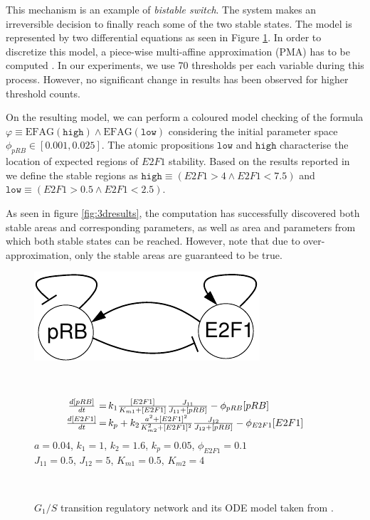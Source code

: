 \documentclass[12pt,oneside]{fithesis2}
\newcommand{\ef}[1]{\ensuremath{\mbox{EF} #1}}
\newcommand{\ag}[1]{\ensuremath{\mbox{AG} #1}}
\begin{document}
				This mechanism is an example of \emph{bistable switch}. The system makes an irreversible decision to finally reach some of the two stable states. The model is represented by two differential equations as seen in Figure \ref{fig:genmodel}. In order to discretize this model, a piece-wise multi-affine approximation (PMA) has to be computed \cite{grosu}. In our experiments, we use 70 thresholds per each variable during this process. However, no significant change in results has been observed for higher threshold counts.
				
				On the resulting model, we can perform a coloured model checking of the formula $\varphi \equiv \ef{\ag{(\mathtt{high})}}\wedge \ef{\ag{(\mathtt{low})}}$ considering the initial parameter space ${\phi_{pRB}\in[0.001,0.025]}$. The atomic propositions  $\mathtt{low}$ and $\mathtt{high}$ characterise the location of expected regions of $E2F1$ stability. Based on the results reported in~\cite{bifurcation} we define the stable regions as $\mathtt{high}\equiv (E2F1>4 \wedge E2F1<7.5)$ and $\mathtt{low}\equiv ({E2F1>0.5} \wedge E2F1<2.5)$.
				
				As seen in figure \ref{fig:3dresults}, the computation has successfully discovered both stable areas and corresponding parameters, as well as area and parameters from which both stable states can be reached. However, note that due to over-approximation, only the stable areas are guaranteed to be true. 
				

\begin{figure}
  \begin{center}
       \vspace*{-6mm}
  \hspace*{-1cm}  \parbox{3.8cm}{\includegraphics[scale=.7]{gs1net.pdf}}~
\parbox{6.5cm}{
\scriptsize
$$\begin{array}{c@{$\,=\,$}l}
\frac{d[pRB]}{dt} & k_1 \frac{[E2F1]}{K_{m1}+[E2F1]}\frac{J_{11}}{J_{11}+[pRB]}  - \phi_{pRB}[pRB]\\[1mm]
\frac{d[E2F1]}{dt} & k_p + k_2 \frac{a^2+[E2F1]^2}{K_{m2}^2+[E2F1]^2}\frac{J_{12}}{J_{12}+[pRB]} - \phi_{E2F1} [E2F1]
\end{array}$$
$a = 0.04$, $k_1=1$, $k_2=1.6$, $k_p=0.05$, $\phi_{E2F1}=0.1$ \\ $J_{11}=0.5$, $J_{12}=5$, $K_{m1}=0.5$, $K_{m2}=4$
}\\
    \end{center}
\caption{$G_1/S$ transition regulatory network and its ODE model taken from \cite{bifurcation}.}
\label{fig:genmodel}
\end{figure}
\end{document}
